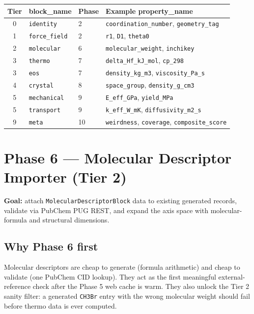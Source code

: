 \documentclass[11pt, a4paper]{article}
\begin{document}
\begin{center}
\begin{tabular}{clll}
\toprule
\textbf{Tier} & \textbf{block\_name} & \textbf{Phase} & \textbf{Example property\_name} \\
\midrule
0 & \texttt{identity}    & 2  & \texttt{coordination\_number}, \texttt{geometry\_tag} \\
1 & \texttt{force\_field} & 2  & \texttt{r1}, \texttt{D1}, \texttt{theta0} \\
2 & \texttt{molecular}    & 6  & \texttt{molecular\_weight}, \texttt{inchikey} \\
3 & \texttt{thermo}       & 7  & \texttt{delta\_Hf\_kJ\_mol}, \texttt{cp\_298} \\
3 & \texttt{eos}          & 7  & \texttt{density\_kg\_m3}, \texttt{viscosity\_Pa\_s} \\
4 & \texttt{crystal}      & 8  & \texttt{space\_group}, \texttt{density\_g\_cm3} \\
5 & \texttt{mechanical}   & 9  & \texttt{E\_eff\_GPa}, \texttt{yield\_MPa} \\
5 & \texttt{transport}    & 9  & \texttt{k\_eff\_W\_mK}, \texttt{diffusivity\_m2\_s} \\
9 & \texttt{meta}         & 10 & \texttt{weirdness}, \texttt{coverage}, \texttt{composite\_score} \\
\bottomrule
\end{tabular}
\end{center}

\section{Phase 6 --- Molecular Descriptor Importer (Tier 2)}

\begin{tierbox}
\textbf{Goal:} attach \texttt{MolecularDescriptorBlock} data to existing generated records,
validate via PubChem PUG REST, and expand the axis space with molecular-formula
and structural dimensions.
\end{tierbox}

\subsection{Why Phase 6 first}

Molecular descriptors are cheap to generate (formula arithmetic) and cheap to
validate (one PubChem CID lookup).  They act as the first meaningful
external-reference check after the Phase 5 web cache is warm.  They also unlock
the Tier 2 sanity filter: a generated \texttt{CH3Br} entry with the wrong
molecular weight should fail before thermo data is ever computed.
\end{document}
